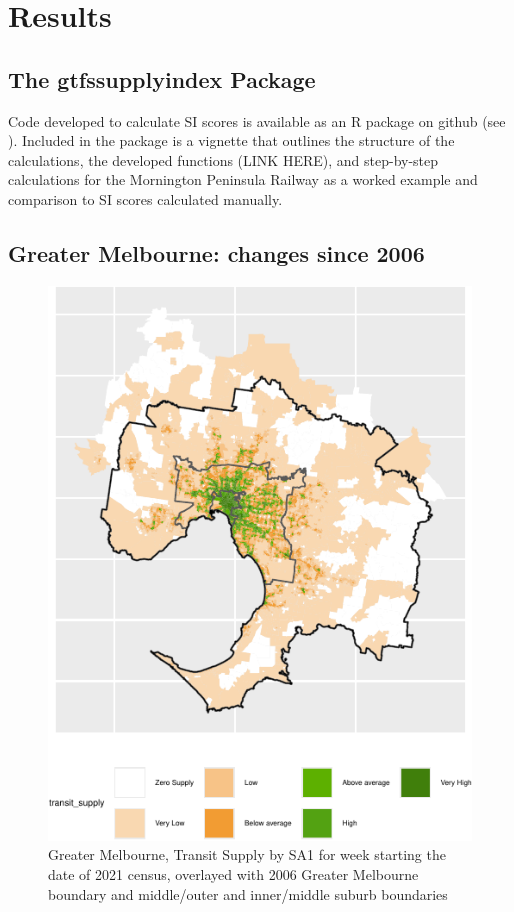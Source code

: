 \documentclass[preprint, 3p,
authoryear]{elsarticle} %
\begin{document}
\section{Results}\label{results}

\subsection{The gtfssupplyindex
Package}\label{the-gtfssupplyindex-package}

Code developed to calculate SI scores is available as an R package on
github (see \citet{gtfssupplyindex_github}). Included in the package is
a vignette that outlines the structure of the calculations, the
developed functions (LINK HERE), and step-by-step calculations for the
Mornington Peninsula Railway as a worked example and comparison to SI
scores calculated manually.

\subsection{Greater Melbourne: changes since
2006}\label{greater-melbourne-changes-since-2006}

\begin{figure}
\includegraphics[width=1\linewidth]{Leveraging_GTFS_to_assess_transit_supply_Transport_Geography_files/figure-latex/Greater_Melbourne_SA1_2021_plot-1} \caption{Greater Melbourne, Transit Supply by SA1 for week starting the date of 2021 census, overlayed with 2006 Greater Melbourne boundary and middle/outer and inner/middle suburb boundaries}\label{fig:Greater_Melbourne_SA1_2021_plot}
\end{figure}
\end{document}
